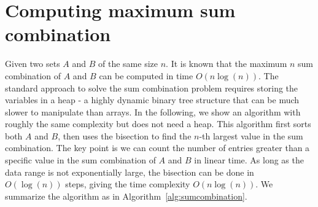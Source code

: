 \documentclass[onefignum, onetabnum]{siamart190516}
\newcommand{\<}{\langle}
\renewcommand{\>}{\rangle}
\begin{document}
\section{Computing maximum sum combination}\label{sec:maxsum}
Given two sets $A$ and $B$ of the same size $n$.
It is known that the maximum $n$ sum combination of $A$ and $B$ can be computed in time $O(n\log(n))$.
The standard approach to solve the sum combination problem requires storing the variables in a heap - a highly dynamic binary tree structure that can be much slower to manipulate than arrays.
In the following, we show an algorithm with roughly the same complexity but does not need a heap.
This algorithm first sorts both $A$ and $B$, then uses the bisection to find the $n$-th largest value in the sum combination.
The key point is we can count the number of entries greater than a specific value
in the sum combination of $A$ and $B$ in linear time.
As long as the data range is not exponentially large, the bisection can be done in $O(\log(n))$ steps, giving the time complexity $O(n\log(n))$.
We summarize the algorithm as in Algorithm~\ref{alg:sumcombination}.
\end{document}
